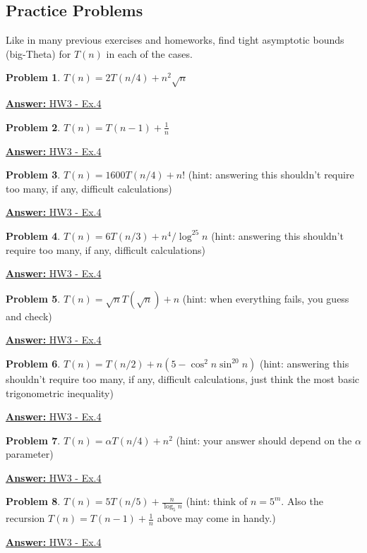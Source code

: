 \documentclass[12pt]{article}
\theoremstyle{definition}
\newtheorem{practiceproblem}{Problem}[section]
\def\scratchwork{\vspace*{15em}} %
\def\psetthree{https://github.com/zacktraczyk/CSE102-Midterm-Study-Guide/blob/main/hw\%20answers/vaggos\_W\_24\_CSE102\_01\_PSET\_3\_solutions.pdf}
\newenvironment{problem}[2]
{
	\def\linktext{#1}
	\def\linkdest{#2}
	\noindent \begin{minipage}{\textwidth}
		\begin{practiceproblem}
}
{	
		\end{practiceproblem}
		\href{\linkdest}{\textbf{Answer:} \linktext}
		\scratchwork
	\end{minipage}
}
\begin{document}
	\subsection{Practice Problems}

	Like in many previous exercises and homeworks, find tight asymptotic bounds
	(big-Theta) for $T(n)$ in each of the cases.

	\begin{problem}{HW3 - Ex.4}{\psetthree}
		$T(n)=2T(n/4)+n^2\sqrt n$
	\end{problem}

	\begin{problem}{HW3 - Ex.4}{\psetthree}
		$T(n)=T(n-1)+\frac1n$
	\end{problem}

	\begin{problem}{HW3 - Ex.4}{\psetthree}
		$T(n)=1600T(n/4)+n!$ (hint: answering this shouldn't require too many,
		if any, difficult calculations)
	\end{problem}

	\begin{problem}{HW3 - Ex.4}{\psetthree}
		$T(n)=6T(n/3)+n^4/\log^{25} n$ (hint: answering this shouldn't require
		too many, if any, difficult calculations)
	\end{problem}

	\begin{problem}{HW3 - Ex.4}{\psetthree}
		$T(n)=\sqrt n T(\sqrt{n}) + n$ (hint: when everything fails, you guess
		and check)
	\end{problem}

	\begin{problem}{HW3 - Ex.4}{\psetthree}
		$T(n)=T(n/2)+n(5-\cos^2n\sin^{20}n)$ (hint: answering this shouldn't
		require too many, if any, difficult calculations, just think the most
		basic trigonometric inequality)
	\end{problem}

	\begin{problem}{HW3 - Ex.4}{\psetthree}
		$T(n)=\alpha T(n/4)+n^2$ (hint: your answer should depend on the
		$\alpha$ parameter)
	\end{problem}

	\begin{problem}{HW3 - Ex.4}{\psetthree}
		$T(n)=5T(n/5) +\frac{n}{\log_5 n}$ (hint: think of $n=5^m$. Also the
		recursion $T(n)=T(n-1)+\frac1n$ above may come in handy.)
	\end{problem}

\end{document}
